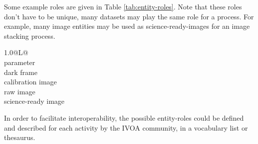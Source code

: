 Some example roles are given in Table \ref{tab:entity-roles}.
Note that these roles don't have to be unique, many datasets may play the same role for 
a process. For example, many image entities may be used as science-ready-images for an 
image stacking process.

\begin{table}[h]
\small
\begin{tabulary}{1.0\textwidth}{@{}L@{}}
\toprule
{} \\%
\midrule
parameter \\%
dark frame \\%
calibration image \\%
raw image \\%
science-ready image \\%
\bottomrule
\end{tabulary}
\caption{Example values for the entity roles as attributes in the 
 and .}
\label{tab:entity-roles}
\end{table}


In order to facilitate interoperability, the possible 
entity-roles could be defined and described for each activity by the IVOA community, in a 
vocabulary list or thesaurus.



%


